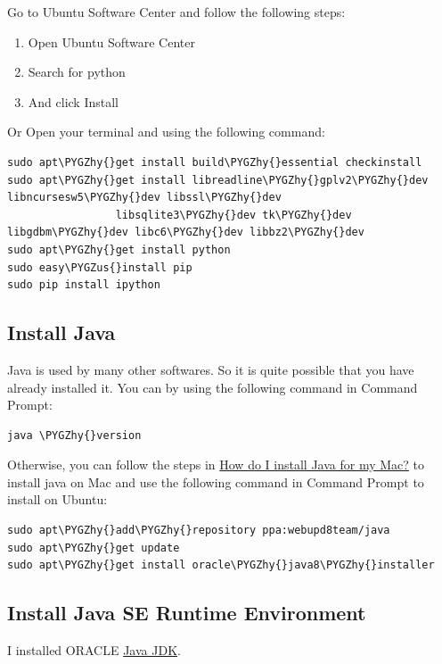 \documentclass[letterpaper,11pt,english]{sphinxmanual}
\def\PYGZus{\char`\_}
\def\PYGZhy{\char`\-}
\begin{document}
Go to Ubuntu Software Center and follow the following steps:
\begin{enumerate}
\item {} 
Open Ubuntu Software Center

\item {} 
Search for python

\item {} 
And click Install

\end{enumerate}

Or Open your terminal and  using the following command:

\begin{Verbatim}[commandchars=\\\{\}]
sudo apt\PYGZhy{}get install build\PYGZhy{}essential checkinstall
sudo apt\PYGZhy{}get install libreadline\PYGZhy{}gplv2\PYGZhy{}dev libncursesw5\PYGZhy{}dev libssl\PYGZhy{}dev
                 libsqlite3\PYGZhy{}dev tk\PYGZhy{}dev libgdbm\PYGZhy{}dev libc6\PYGZhy{}dev libbz2\PYGZhy{}dev
sudo apt\PYGZhy{}get install python
sudo easy\PYGZus{}install pip
sudo pip install ipython
\end{Verbatim}


\subsection{Install Java}
\label{setup:install-java}
Java is used by many other softwares. So it is quite possible that you have already installed it. You can
by using the following command in Command Prompt:

\begin{Verbatim}[commandchars=\\\{\}]
java \PYGZhy{}version
\end{Verbatim}

Otherwise, you can follow the steps in \href{https://java.com/en/download/help/mac\_install.xml}{How do I install Java for my Mac?} to install java on Mac and use the following command in Command Prompt to install on Ubuntu:

\begin{Verbatim}[commandchars=\\\{\}]
sudo apt\PYGZhy{}add\PYGZhy{}repository ppa:webupd8team/java
sudo apt\PYGZhy{}get update
sudo apt\PYGZhy{}get install oracle\PYGZhy{}java8\PYGZhy{}installer
\end{Verbatim}


\subsection{Install Java SE Runtime Environment}
\label{setup:install-java-se-runtime-environment}
I installed ORACLE \href{http://www.oracle.com/technetwork/java/javase/downloads/index-jsp-138363.html}{Java JDK}.
\end{document}
